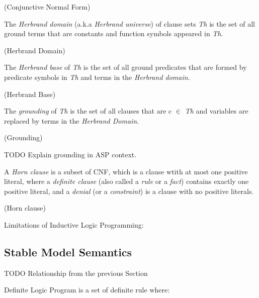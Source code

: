 \documentclass[12pt,twoside]{report}
\begin{document}
\begin{examp} (Conjunctive Normal Form)

\end{examp}

The \textit{Herbrand domain} (a.k.a \textit{Herbrand universe}) of clause sets \textit{Th} is the set of all ground terms that are constants and function symbols appeared in \textit{Th}.

\begin{examp} (Herbrand Domain)

\end{examp}

The \textit{Herbrand base} of \textit{Th} is the set of all ground predicates that are formed by predicate symbols in \textit{Th} and terms in the \textit{Herbrand domain}.

\begin{examp} (Herbrand Base)

\end{examp}

The \textit{grounding} of \textit{Th} is the set of all clauses that are c $\in$ \textit{Th} and variables are replaced by terms in the \textit{Herbrand Domain}.

\begin{examp} (Grounding)

\end{examp}


TODO Explain grounding in ASP context.


A \textit{Horn clause} is a subset of CNF, which is a clause wtith at most one positive literal, where a \textit{definite clause} (also called a \textit{rule} or a \textit{fact}) contains exactly one positive literal, and a \textit{denial} (or a \textit{constraint}) is a clause with no positive literals.

\begin{examp} (Horn clause)

\end{examp}

Limitations of Inductive Logic Programming:

\subsection{Stable Model Semantics}

TODO Relationship from the previous Section

Definite Logic Program is a set of definite rule where: \newline
\end{document}
